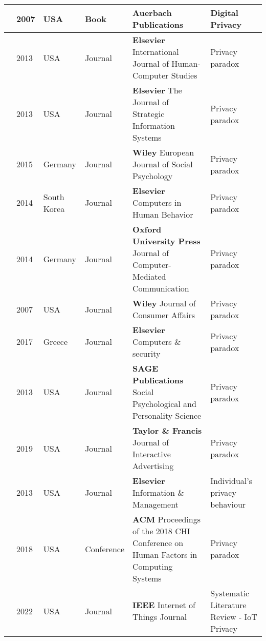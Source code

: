 \begin{footnotesize}
\begin{longtable}{p{1.2cm} p{1cm} p{1.5cm} p{3.2cm} p{5cm} p{3cm}}
        \cite{acquisti2007can} & 2007 & USA & Book & \textbf{Auerbach Publications} & Digital Privacy \\
        \hline
        \cite{knijnenburg2013dimensionality} & 2013 & USA & Journal & \textbf{Elsevier} International Journal of Human-Computer Studies & Privacy paradox \\
        \hline
        \cite{wakefield2013influence} & 2013 & USA & Journal & \textbf{Elsevier} The Journal of Strategic Information Systems & Privacy paradox \\
        \hline
        \cite{dienlin2015privacy} & 2015 & Germany & Journal & \textbf{Wiley} European Journal of Social Psychology & Privacy paradox \\
        \hline
        \cite{baek2014solving} & 2014 & South Korea & Journal & \textbf{Elsevier} Computers in Human Behavior & Privacy paradox \\
        \hline
        \cite{taddicken2014privacy} & 2014 & Germany & Journal & \textbf{Oxford University Press} Journal of Computer-Mediated Communication & Privacy paradox \\
        \hline
        \cite{norberg2007privacy} & 2007 & USA & Journal & \textbf{Wiley} Journal of Consumer Affairs & Privacy paradox \\
        \hline
        \cite{kokolakis2017privacy} & 2017 & Greece & Journal & \textbf{Elsevier} Computers \& security & Privacy paradox \\
        \hline
        \cite{brandimarte2013misplaced} & 2013 & USA & Journal & \textbf{SAGE Publications} Social Psychological and Personality Science & Privacy paradox \\
        \hline
        \cite{xie2019consumers} & 2019 & USA & Journal & \textbf{Taylor \& Francis} Journal of Interactive Advertising & Privacy paradox \\
        \hline
        \cite{SCHWAIG20131} & 2013 & USA & Journal & \textbf{Elsevier} Information \& Management & Individual's privacy behaviour \\
        \hline
        \cite{sannon2018privacy} & 2018 & USA & Conference & \textbf{ACM} Proceedings of the 2018 CHI Conference on Human Factors in Computing Systems & Privacy paradox \\
        \hline
        \cite{Gupta2022Privacy} & 2022 & USA & Journal & \textbf{IEEE} Internet of Things Journal & Systematic Literature Review - IoT Privacy \\

\end{longtable}
\end{footnotesize}
